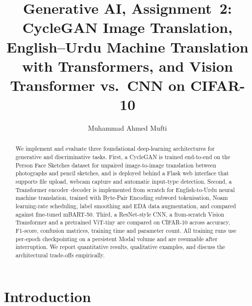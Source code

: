 \documentclass[runningheads]{llncs}
\begin{document}
\title{Generative AI, Assignment~2:\\
CycleGAN Image Translation, English--Urdu Machine Translation with
Transformers, and Vision Transformer vs.\ CNN on CIFAR-10}

\author{Muhammad Ahmed Mufti}


\maketitle

\begin{abstract}
We implement and evaluate three foundational deep-learning architectures
for generative and discriminative tasks. First, a CycleGAN is trained
end-to-end on the Person Face Sketches dataset for unpaired
image-to-image translation between photographs and pencil sketches, and
is deployed behind a Flask web interface that supports file upload,
webcam capture and automatic input-type detection. Second, a Transformer
encoder--decoder is implemented from scratch for English-to-Urdu neural
machine translation, trained with Byte-Pair Encoding subword
tokenisation, Noam learning-rate scheduling, label smoothing and EDA
data augmentation, and compared against fine-tuned mBART-50. Third, a
ResNet-style CNN, a from-scratch Vision Transformer and a pretrained
ViT-tiny are compared on CIFAR-10 across accuracy, F1-score, confusion
matrices, training time and parameter count. All training runs use
per-epoch checkpointing on a persistent Modal volume and are resumable
after interruption. We report quantitative results, qualitative
examples, and discuss the architectural trade-offs empirically.

\end{abstract}

\section{Introduction}
\end{document}
